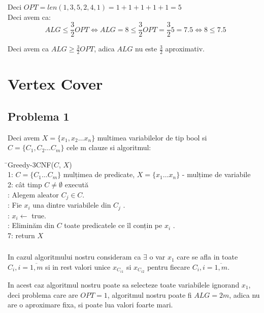 \documentclass[a4paper]{report} %
\begin{document}
Deci $OPT=len(1,3,5,2,4,1)=1+1+1+1+1=5$\\

Deci avem ca:
\[ALG\leq \frac{3}{2}OPT \Leftrightarrow ALG=8\leq \frac{3}{2}OPT = \frac{3}{2}5 = 7.5 \Leftrightarrow 8\leq 7.5\]

Deci avem ca $ALG\geq \frac{3}{2}OPT$, adica $ALG$ nu este $\frac{3}{2}$ aproximativ.

\chapter*{Vertex Cover}
\setcounter{section}{0}

\section{Problema 1}

Deci avem $X=\{x_{1},x_{2}\dots x_{n}\}$ multimea variabilelor de tip bool si $C=\{C_{1},C_{2}\dots C_{m}\}$ cele m clauze si algoritmul:

\begin{tabbing}
\hspace{2em}
\= \kill Greedy-3CNF($C$, $X$)\\
1: $C=\{C_{1}\dots C_{m}\}$ mulțimea de predicate, $X=\{x_{1}\dots x_{n}\}$ - mulțime de variabile\\ 
2: cât timp $C\neq \emptyset$ execută\\ 
: Alegem aleator $C_{j}\in C$.\\
: Fie $x_{i}$ una dintre variabilele din $C_{j}$ .\\
: $x_{i}\leftarrow$ true.\\
: Eliminăm din $C$ toate predicatele ce îl conțin pe $x_{i}$ .\\
7: return $X$\\
\end{tabbing}


\subsection{}

In cazul algoritmului nostru consideram ca $\exists$ o var $x_{1}$ care se afla in toate $C_{i}, i=\overline{1,m}$ si in rest valori unice $x_{C_{i1}}$ si $x_{C_{i2}}$ pentru fiecare $C_{i}, i=\overline{1,m}$.

In acest caz algoritmul nostru poate sa selecteze toate variabilele ignorand $x_{1}$, deci problema care are $OPT=1$, algoritmul nostru poate fi $ALG=2m$, adica nu are o aproximare fixa, si poate lua valori foarte mari.\\
\end{document}
